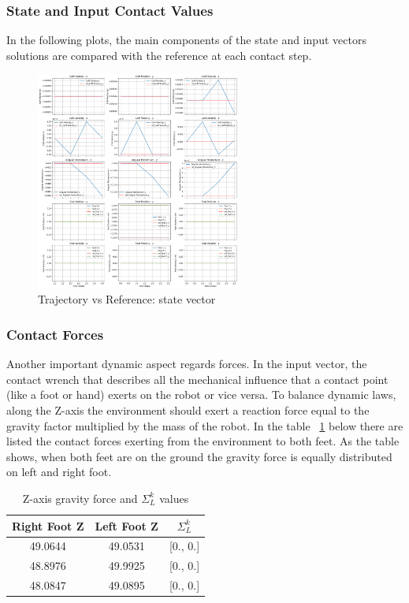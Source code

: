 \documentclass[main.tex]{subfiles}
\begin{document}
\subsubsection*{State and Input Contact Values}
In the following plots, the main components of the state and input vectors solutions are compared with the reference at each contact step.
\begin{figure}[htbp]
    \centering
    \includegraphics[width=0.6\textwidth]{figures/contact_x_still.png}
    \caption{Trajectory vs Reference: state vector}
    \label{fig:contact_x_still}
\end{figure}

\subsubsection*{Contact Forces}
Another important dynamic aspect regards forces. 
In the input vector, the contact wrench that describes all the mechanical influence that a contact point (like a foot or hand) exerts on the robot or vice versa.
To balance dynamic laws, along the Z-axis the environment should exert a reaction force equal to the gravity factor multiplied by the mass of the robot. In the table ~\ref{tab:contact_forces_still}  below there are listed the contact forces exerting from the environment to both feet. As the table shows, when both feet are on the ground the gravity force is equally distributed on left and right foot.
\begin{table}[H]
\label{tab:contact_forces_still}
\centering
\begin{tabular}{ccc}
\toprule
Right Foot Z & Left Foot Z & $\Sigma_L^k$ \\
\midrule
49.0644 & 49.0531 & [0., 0.] \\
48.8976 & 49.9925 & [0., 0.] \\
48.0847 & 49.0895 & [0., 0.] \\
\bottomrule
\end{tabular}
\caption{Z-axis gravity force and $\Sigma_L^k$ values}
\end{table}
\end{document}

